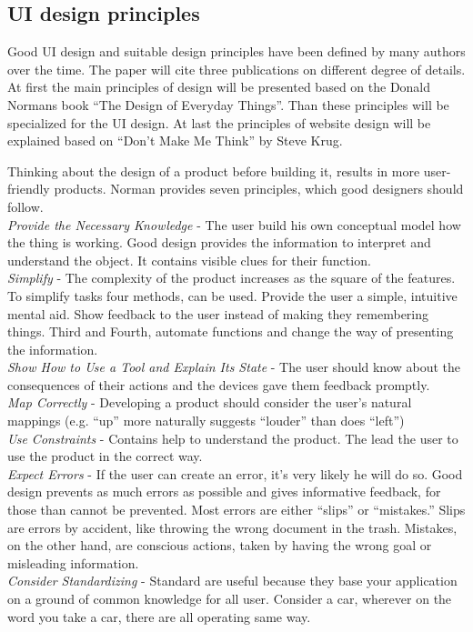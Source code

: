 \documentclass[american,a4paper,oneside,,tablecaptionabove]{scrbook}
\begin{document}
\subsection{UI design principles}\label{ui-design-principles}

Good UI design and suitable design principles have been defined by many
authors over the time. The paper will cite three publications on
different degree of details. At first the main principles of design will
be presented based on the Donald Normans book \enquote{The Design of
Everyday Things}. Than these principles will be specialized for the UI
design. At last the principles of website design will be explained based
on \enquote{Don't Make Me Think} by Steve Krug.

Thinking about the design of a product before building it, results in
more user-friendly products. Norman provides seven principles, which
good designers should follow.\\

\emph{Provide the Necessary Knowledge} - The user build his own
conceptual model how the thing is working. Good design provides the
information to interpret and understand the object. It contains visible
clues for their function.\\
\emph{Simplify} - The complexity of the product increases as the square
of the features. To simplify tasks four methods, can be used. Provide
the user a simple, intuitive mental aid. Show feedback to the user
instead of making they remembering things. Third and Fourth, automate
functions and change the way of presenting the information.\\
\emph{Show How to Use a Tool and Explain Its State} - The user should
know about the consequences of their actions and the devices gave them
feedback promptly.\\
\emph{Map Correctly} - Developing a product should consider the user's
natural mappings (e.g. \enquote{up} more naturally suggests
\enquote{louder} than does \enquote{left})\\
\emph{Use Constraints} - Contains help to understand the product. The
lead the user to use the product in the correct way.\\
\emph{Expect Errors} - If the user can create an error, it's very likely
he will do so. Good design prevents as much errors as possible and gives
informative feedback, for those than cannot be prevented. Most errors
are either \enquote{slips} or \enquote{mistakes.} Slips are errors by
accident, like throwing the wrong document in the trash. Mistakes, on
the other hand, are conscious actions, taken by having the wrong goal or
misleading information.\\
\emph{Consider Standardizing} - Standard are useful because they base
your application on a ground of common knowledge for all user. Consider
a car, wherever on the word you take a car, there are all operating same
way.
\end{document}
